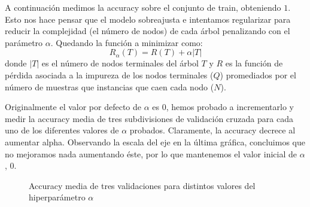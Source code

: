 \documentclass[a4]{article}
\begin{document}
A continuación medimos la accuracy sobre el conjunto de train,
obteniendo $1$. Esto nos hace pensar que el modelo sobreajusta e
intentamos regularizar para reducir la complejidad (el número de
nodos) de cada árbol penalizando con el parámetro $\alpha$. Quedando
la función a minimizar como:
\[R_\alpha(T)=R(T)+\alpha|T|\] donde $|T|$ es el número de nodos
terminales del árbol $T$ y $R$ es la función de pérdida asociada a la
impureza de los nodos terminales ($Q$) promediados por el número de
muestras que instancias que caen cada nodo ($N$).

Originalmente el valor por defecto de $\alpha$ es 0, hemos probado a
incrementarlo y medir la accuracy media de tres subdivisiones de
validación cruzada para cada uno de los diferentes valores de $\alpha$
probados. Claramente, la accuracy decrece al aumentar
alpha. Observando la escala del eje en la última gráfica, concluimos
que no mejoramos nada aumentando éste, por lo que mantenemos el valor
inicial de $\alpha$, $0$.

\begin{figure}[H]
  \centering
  \caption{Accuracy media de tres validaciones para distintos valores del hiperparámetro $\alpha$}
  \label{fig:HyperparametersRF}
\end{figure}
\end{document}
